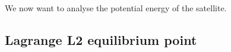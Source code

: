 We now want to analyse the potential energy of the satellite. 

\subsection{Lagrange L2 equilibrium point}
\label{sec:lagrange_L2}

